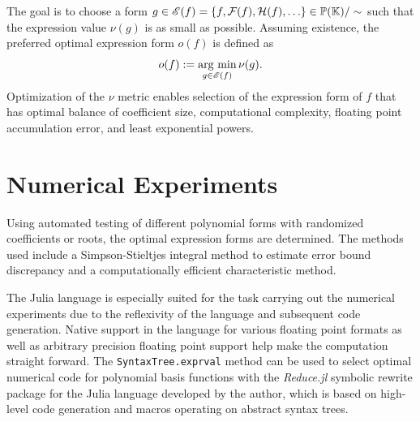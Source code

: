 \documentclass[]{elsarticle}
\begin{document}
The goal is to choose a form $g\in\ms E(f)=\set{f,\mc F(f),\mc H(f),\dots}\in\mb P(\mb K)/\sim$ such that the expression value $\nu(g)$ is as small as possible.
Assuming existence, the preferred optimal expression form $o(f)$ is defined as
$$ o(f) := \underset{g\in\mathscr{E}(f)}{\text{arg min}}\, \nu(g). $$
Optimization of the $\nu$ metric enables selection of the expression form of $f$ that has optimal balance of coefficient size, computational complexity, floating point accumulation error, and least exponential powers.

\section{Numerical Experiments}
Using automated testing \cite{chakravala-wilkinson} of different polynomial forms with randomized coefficients or roots, the optimal expression forms are determined.
The methods used include a Simpson-Stieltjes integral method to estimate error bound discrepancy and a computationally efficient characteristic method. 

 The Julia language is especially suited for the task carrying out the numerical experiments due to the reflexivity of the language and subsequent code generation.
 Native support in the language for various floating point formats as well as arbitrary precision floating point support help make the computation straight forward.
The \verb+SyntaxTree.exprval+ method can be used to select optimal numerical code for polynomial basis functions with the \textit{Reduce.jl} \cite{chakravala-reduce} symbolic rewrite package for the Julia language developed by the author, which %
is based on high-level code generation and macros operating on abstract syntax trees.
\end{document}
